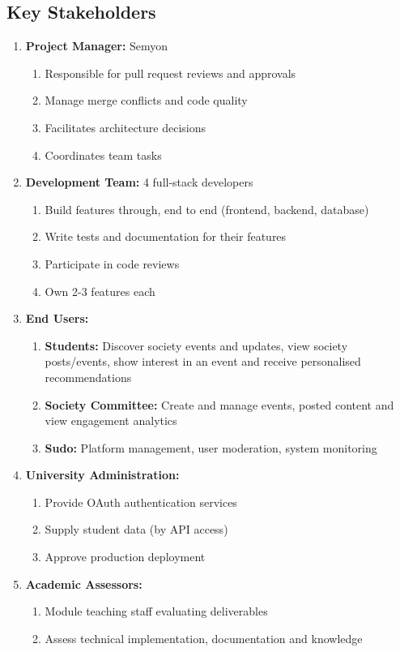 \documentclass[12pt,a4paper]{article}
\begin{document}
\subsection{Key Stakeholders}

\begin{enumerate}[label=(\arabic*)]
    \item \textbf{Project Manager:} Semyon
    \begin{enumerate}
        \item Responsible for pull request reviews and approvals
        \item Manage merge conflicts and code quality
        \item Facilitates architecture decisions
        \item Coordinates team tasks
    \end{enumerate}

    \item \textbf{Development Team:} 4 full-stack developers
    \begin{enumerate}
        \item Build features through, end to end (frontend, backend, database)
        \item Write tests and documentation for their features
        \item Participate in code reviews
        \item Own 2-3 features each
    \end{enumerate}

    \item \textbf{End Users:}
    \begin{enumerate}
        \item \textbf{Students:} Discover society events and updates, view society posts/events, show interest in an event and receive personalised recommendations
        \item \textbf{Society Committee:} Create and manage events, posted content and view engagement analytics
        \item \textbf{Sudo:} Platform management, user moderation, system monitoring
    \end{enumerate}

    \item \textbf{University Administration:}
    \begin{enumerate}
        \item Provide OAuth authentication services
        \item Supply student data (by API access)
        \item Approve production deployment
    \end{enumerate}

    \item \textbf{Academic Assessors:}
    \begin{enumerate}
        \item Module teaching staff evaluating deliverables
        \item Assess technical implementation, documentation and knowledge
    \end{enumerate}
\end{enumerate}
\end{document}
